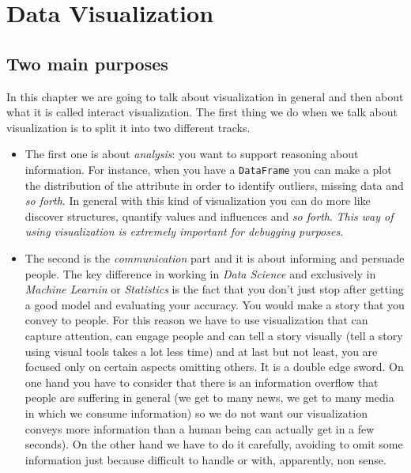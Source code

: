 

\section{Data Visualization}


\subsection{Two main purposes}

In this chapter we are going to talk about visualization in general and then about what it is called interact visualization. The first thing we do when we talk about visualization is to split it into two different tracks. 

\begin{itemize}
\item {The first one is about \emph{analysis}: you want to support reasoning about information. For instance, when you have a \texttt{DataFrame} you can make a plot the distribution of the attribute in order to identify outliers, missing data and \emph{so forth}. In general with this kind of visualization you can do more like discover structures, quantify values and influences and \emph{so forth}.
\emph{This way of using visualization is extremely important for debugging purposes}.}

\item{The second  is the \emph{communication} part and it is about informing and persuade people.  The key difference in working in \emph{Data Science} and exclusively in \emph{Machine Learnin} or \emph{Statistics} is the fact that you don't just stop after getting a good model and evaluating your accuracy. You would make a story that you convey to people.
For this reason we have to use visualization that can capture attention, can engage people and can tell a story visually (tell a story using visual tools takes a lot less time) and at last but not least, you are focused only on certain aspects omitting others. It is a double edge sword. On one hand you have to consider that there is an information overflow that people are suffering in general (we get to many news, we get to many media in which we consume information) so we do not want our visualization conveys more information than  a human being can actually get in a few seconds). On the other hand we have to do it carefully, avoiding to omit some information just because difficult to handle or with, apparently, non sense.}
\end{itemize}

